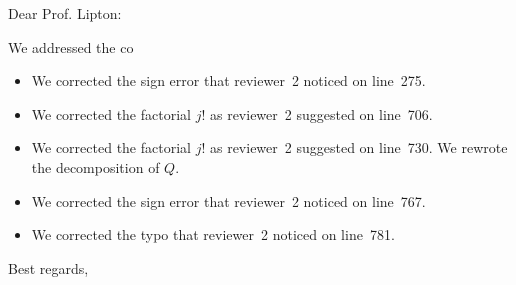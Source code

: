 \documentclass{letter}
\date{March \textcolor{violet}{--}, 2023}
\begin{document}
\begin{letter}{}
\opening{Dear Prof. Lipton:}

\color{violet}
We addressed the co
\begin{itemize}
    \item We corrected the sign error that reviewer~2 noticed on line~275.
    \item We corrected the factorial $j!$ as reviewer~2 suggested on line~706.
     \item We corrected the factorial $j!$ as reviewer~2 suggested on line~730. We rewrote the decomposition of $Q$. 
     \item We corrected the sign error that reviewer~2 noticed on line~767.
      \item We corrected the typo that reviewer~2 noticed on line~781.
\end{itemize}
\color{black}
\closing{Best regards,}
\end{letter}
\end{document}

